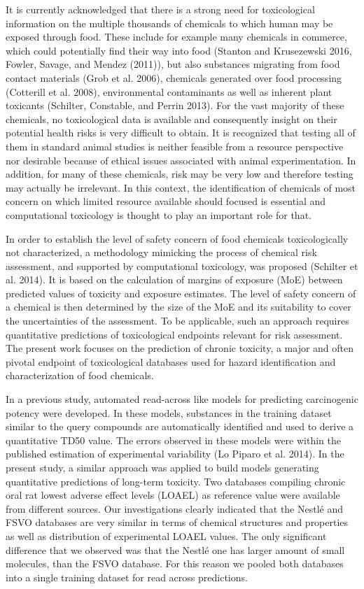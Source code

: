 \documentclass[]{achemso}
\begin{document}
It is currently acknowledged that there is a strong need for
toxicological information on the multiple thousands of chemicals to
which human may be exposed through food. These include for example many
chemicals in commerce, which could potentially find their way into food
(Stanton and Krusezewski 2016, Fowler, Savage, and Mendez (2011)), but
also substances migrating from food contact materials (Grob et al.
2006), chemicals generated over food processing (Cotterill et al. 2008),
environmental contaminants as well as inherent plant toxicants
(Schilter, Constable, and Perrin 2013). For the vast majority of these
chemicals, no toxicological data is available and consequently insight
on their potential health risks is very difficult to obtain. It is
recognized that testing all of them in standard animal studies is
neither feasible from a resource perspective nor desirable because of
ethical issues associated with animal experimentation. In addition, for
many of these chemicals, risk may be very low and therefore testing may
actually be irrelevant. In this context, the identification of chemicals
of most concern on which limited resource available should focused is
essential and computational toxicology is thought to play an important
role for that.

In order to establish the level of safety concern of food chemicals
toxicologically not characterized, a methodology mimicking the process
of chemical risk assessment, and supported by computational toxicology,
was proposed (Schilter et al. 2014). It is based on the calculation of
margins of exposure (MoE) between predicted values of toxicity and
exposure estimates. The level of safety concern of a chemical is then
determined by the size of the MoE and its suitability to cover the
uncertainties of the assessment. To be applicable, such an approach
requires quantitative predictions of toxicological endpoints relevant
for risk assessment. The present work focuses on the prediction of
chronic toxicity, a major and often pivotal endpoint of toxicological
databases used for hazard identification and characterization of food
chemicals.

In a previous study, automated read-across like models for predicting
carcinogenic potency were developed. In these models, substances in the
training dataset similar to the query compounds are automatically
identified and used to derive a quantitative TD50 value. The errors
observed in these models were within the published estimation of
experimental variability (Lo Piparo et al. 2014). In the present study,
a similar approach was applied to build models generating quantitative
predictions of long-term toxicity. Two databases compiling chronic oral
rat lowest adverse effect levels (LOAEL) as reference value were
available from different sources. Our investigations clearly indicated
that the Nestlé and FSVO databases are very similar in terms of chemical
structures and properties as well as distribution of experimental LOAEL
values. The only significant difference that we observed was that the
Nestlé one has larger amount of small molecules, than the FSVO database.
For this reason we pooled both databases into a single training dataset
for read across predictions.
\end{document}

